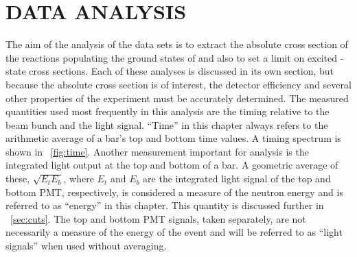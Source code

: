 %
%
%
%
%
%
%
%

%
%

\chapter{DATA ANALYSIS}
\label{chap:dataAnalysis}

The aim of the analysis of the \reaction data sets is to extract the absolute cross section of the reactions populating the ground states of \SeProducts and also to set a limit on excited \zp-state cross sections.  Each of these analyses is discussed in its own section, but because the absolute cross section is of interest, the detector efficiency and several other properties of the experiment must be accurately determined.  The measured quantities used most frequently in this analysis are the timing relative to the beam bunch and the light signal.  ``Time'' in this chapter always refers to the arithmetic average of a bar's top and bottom time values.  A timing spectrum is shown in {\fig}~\ref{fig:time}.  Another measurement important for analysis is the integrated light output at the top and bottom of a bar.  A geometric average of these, $\sqrt{E_tE_b}$, where $E_t$ and $E_b$ are the integrated light signal of the top and bottom PMT, respectively, is considered a measure of the neutron energy and is referred to as ``energy'' in this chapter.  This quantity is discussed further in {\sect}~\ref{sec:cuts}.   The top and bottom PMT signals, taken separately, are not necessarily a measure of the energy of the event and will be referred to as ``light signals'' when used without averaging. 
